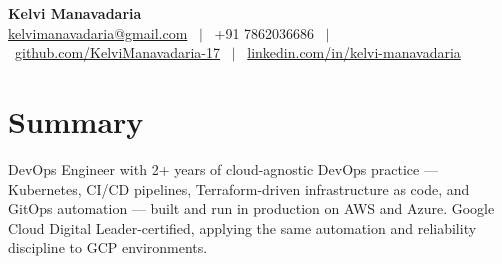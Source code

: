 \documentclass[a4paper,10.999999pt]{article}
\begin{document}
    \pagestyle{empty}



    \begin{center}
    \LARGE{\textbf{Kelvi Manavadaria}} \\[1.5pt]
    {\small
    \href{mailto:kelvimanavadaria@gmail.com}{kelvimanavadaria@gmail.com} \ $|$ \
    +91 7862036686 \ $|$ \
    \href{https://github.com/KelviManavadaria-17}{github.com/KelviManavadaria-17} \ $|$ \
    \href{https://www.linkedin.com/in/kelvi-manavadaria/}{linkedin.com/in/kelvi-manavadaria}
    }
    \end{center}

    \vspace{0.5pt}


    \section{Summary}
DevOps Engineer with 2+ years of cloud-agnostic DevOps practice — Kubernetes, CI/CD pipelines, Terraform-driven infrastructure as code, and GitOps automation — built and run in production on AWS and Azure. Google Cloud Digital Leader-certified, applying the same automation and reliability discipline to GCP environments.

\end{document}
